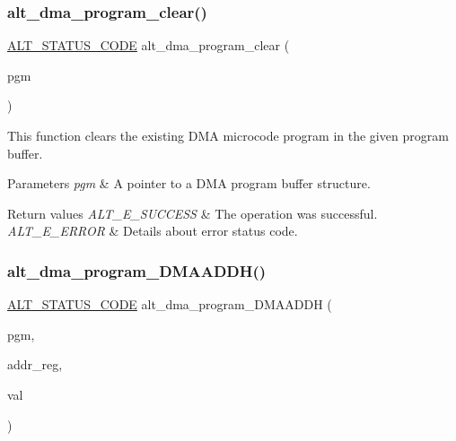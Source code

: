 \subsubsection{\texorpdfstring{alt\_dma\_program\_clear()}{alt\_dma\_program\_clear()}}
{\footnotesize\ttfamily \mbox{\hyperlink{hwlib_8h_abdb0d369f069723ca55d6c94bcaaaa12}{A\+L\+T\+\_\+\+S\+T\+A\+T\+U\+S\+\_\+\+C\+O\+DE}} alt\+\_\+dma\+\_\+program\+\_\+clear (\begin{DoxyParamCaption}\item[{\mbox{\hyperlink{group__ALT__DMA__PRG_gadb7028531574894854db4db6d797de97}{A\+L\+T\+\_\+\+D\+M\+A\+\_\+\+P\+R\+O\+G\+R\+A\+M\+\_\+t}} $\ast$}]{pgm }\end{DoxyParamCaption})}

This function clears the existing D\+MA microcode program in the given program buffer.


\begin{DoxyParams}{Parameters}
{\em pgm} & A pointer to a D\+MA program buffer structure.\\
\hline
\end{DoxyParams}

\begin{DoxyRetVals}{Return values}
{\em A\+L\+T\+\_\+\+E\+\_\+\+S\+U\+C\+C\+E\+SS} & The operation was successful. \\
\hline
{\em A\+L\+T\+\_\+\+E\+\_\+\+E\+R\+R\+OR} & Details about error status code. \\
\hline
\end{DoxyRetVals}
\mbox{\label{group__ALT__DMA__PRG_ga4d3de32f2f2fd611f975efb050352b84}} 
\subsubsection{\texorpdfstring{alt\_dma\_program\_DMAADDH()}{alt\_dma\_program\_DMAADDH()}}
{\footnotesize\ttfamily \mbox{\hyperlink{hwlib_8h_abdb0d369f069723ca55d6c94bcaaaa12}{A\+L\+T\+\_\+\+S\+T\+A\+T\+U\+S\+\_\+\+C\+O\+DE}} alt\+\_\+dma\+\_\+program\+\_\+\+D\+M\+A\+A\+D\+DH (\begin{DoxyParamCaption}\item[{\mbox{\hyperlink{group__ALT__DMA__PRG_gadb7028531574894854db4db6d797de97}{A\+L\+T\+\_\+\+D\+M\+A\+\_\+\+P\+R\+O\+G\+R\+A\+M\+\_\+t}} $\ast$}]{pgm,  }\item[{\mbox{\hyperlink{group__ALT__DMA__PRG_ga772371a3d6334e110911154cf94950e8}{A\+L\+T\+\_\+\+D\+M\+A\+\_\+\+P\+R\+O\+G\+R\+A\+M\+\_\+\+R\+E\+G\+\_\+t}}}]{addr\+\_\+reg,  }\item[{uint16\+\_\+t}]{val }\end{DoxyParamCaption})}

